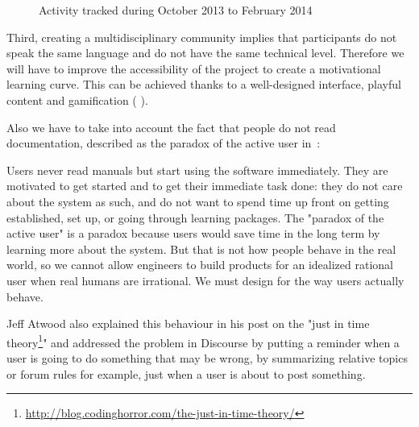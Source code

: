 \begin{figure}[tb]
\centering
    \hfil
    \caption{Activity tracked during October 2013 to February 2014}
    \label{fig:poppy_community}
\end{figure}


Third, creating a multidisciplinary community implies that participants do not speak the same language and do not have the same technical level. Therefore we will have to improve the accessibility of the project to create a motivational learning curve. This can be achieved thanks to a well-designed interface, playful content and gamification (\cite{deterding2011game} \cite{groh2012gamification}).


Also we have to take into account the fact that people do not read documentation, described as the paradox of the active user in~\parencite{carroll1987paradox}:
\begin{formal}
    Users never read manuals but start using the software immediately. They are motivated to get started and to get their immediate task done: they do not care about the system as such, and do not want to spend time up front on getting established, set up, or going through learning packages.
    The "paradox of the active user" is a paradox because users would save time in the long term by learning more about the system. But that is not how people behave in the real world, so we cannot allow engineers to build products for an idealized rational user when real humans are irrational. We must design for the way users actually behave.
\end{formal}

Jeff Atwood also explained this behaviour in his post on the "just in time theory\footnote{\url{http://blog.codinghorror.com/the-just-in-time-theory/}}" and addressed the problem in Discourse by putting a reminder when a user is going to do something that may be wrong, by summarizing relative topics or forum rules for example, just when a user is about to post something.

